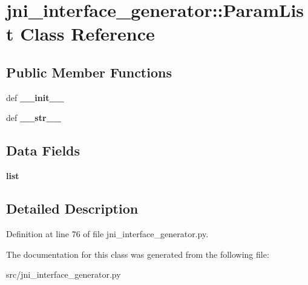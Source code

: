 \section{jni\_\-interface\_\-generator::ParamList Class Reference}
\label{classjni__interface__generator_1_1_param_list}
\subsection*{Public Member Functions}
\begin{DoxyCompactItemize}
\item 
def {\bfseries \_\-\_\-init\_\-\_\-}\label{classjni__interface__generator_1_1_param_list_a33fb9ba90bbb8a92ab466f624f35dd63}

\item 
def {\bfseries \_\-\_\-str\_\-\_\-}\label{classjni__interface__generator_1_1_param_list_af51557af4b93f320873022c0bc5a5df9}

\end{DoxyCompactItemize}
\subsection*{Data Fields}
\begin{DoxyCompactItemize}
\item 
{\bfseries list}\label{classjni__interface__generator_1_1_param_list_acf16e404481c1ff386050b3236b2604f}

\end{DoxyCompactItemize}


\subsection{Detailed Description}


Definition at line 76 of file jni\_\-interface\_\-generator.py.



The documentation for this class was generated from the following file:\begin{DoxyCompactItemize}
\item 
src/jni\_\-interface\_\-generator.py\end{DoxyCompactItemize}
